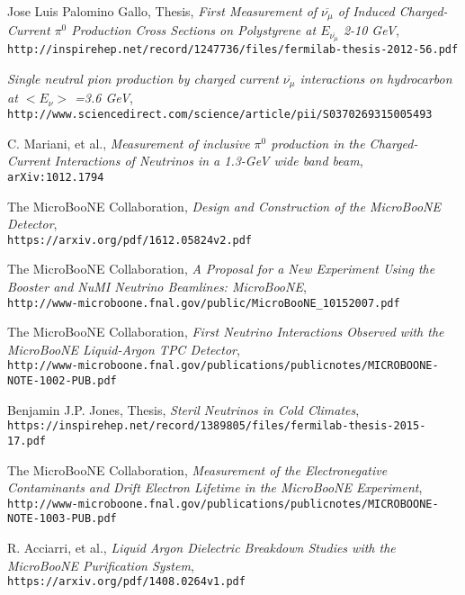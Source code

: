 \documentclass[12pt]{article}
\begin{document}
\begin{thebibliography}{20}
  Jose Luis Palomino Gallo, Thesis, \emph{First Measurement of $\overline{\nu_\mu}$ of Induced Charged-Current $\pi^0$ Production Cross Sections on Polystyrene at $E_{\overline{\nu_\mu}}$ 2-10 GeV},\\
  \texttt{http://inspirehep.net/record/1247736/files/fermilab-thesis-2012-56.pdf}  
  
   \emph{Single neutral pion production by charged current $\overline{\nu_\mu}$ interactions on hydrocarbon at $< E_\nu >$ =3.6 GeV},\\
  \texttt{http://www.sciencedirect.com/science/article/pii/S0370269315005493}  
  
  C. Mariani, et al., \emph{Measurement of inclusive $\pi^0$ production in the Charged-Current Interactions of Neutrinos in a 1.3-GeV wide band beam},\\
  \texttt{arXiv:1012.1794}

  The MicroBooNE Collaboration, \emph{Design and Construction of the MicroBooNE Detector},\\
  \texttt{https://arxiv.org/pdf/1612.05824v2.pdf}

  The MicroBooNE Collaboration, \emph{A Proposal for a New Experiment Using the Booster and NuMI Neutrino Beamlines: MicroBooNE},\\
  \texttt{http://www-microboone.fnal.gov/public/MicroBooNE\_10152007.pdf}

  The MicroBooNE Collaboration, \emph{First Neutrino Interactions Observed with the MicroBooNE Liquid-Argon TPC Detector},\\
  \texttt{http://www-microboone.fnal.gov/publications/publicnotes/MICROBOONE-NOTE-1002-PUB.pdf}

  Benjamin J.P. Jones, Thesis, \emph{Steril Neutrinos in Cold Climates},\\
  \texttt{https://inspirehep.net/record/1389805/files/fermilab-thesis-2015-17.pdf}

  The MicroBooNE Collaboration, \emph{Measurement of the Electronegative Contaminants and Drift Electron Lifetime in the MicroBooNE Experiment},\\
  \texttt{http://www-microboone.fnal.gov/publications/publicnotes/MICROBOONE-NOTE-1003-PUB.pdf}

  R. Acciarri, et al., \emph{Liquid Argon Dielectric Breakdown Studies with the MicroBooNE Purification System}, \\
  \texttt{https://arxiv.org/pdf/1408.0264v1.pdf}


\end{thebibliography}
\end{document}
